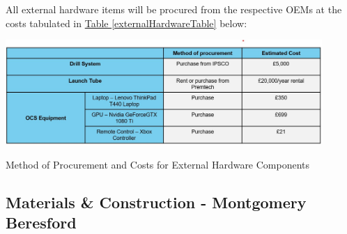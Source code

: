 \documentclass[11pt]{article}		%
\newcommand{\tableref}[1]{\hyperref[#1]{Table \ref*{#1}}}     %
\begin{document}
    All external hardware items will be procured from the respective OEMs at the costs tabulated in \tableref{externalHardwareTable} below:
    			\begin{table}[H]
    	  		    \centering
    	  		    \includegraphics[width=0.9\textwidth]{External Hardware costs.jpg}
    				\caption{Method of Procurement and Costs for External Hardware Components}
    				\label{externalHardwareTable}
    			\end{table}
    		
    		
		\subsection[Materials \& Construction]{Materials \& Construction - Montgomery Beresford}
		
\end{document}
